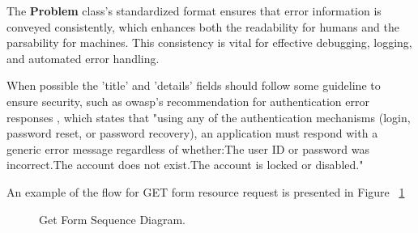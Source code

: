 The \textbf{Problem} class's standardized format ensures that error information is conveyed consistently, which enhances both the readability for humans and the parsability for machines. This consistency is vital for effective debugging, logging, and automated error handling.

When possible the 'title' and 'details' fields should follow some guideline to ensure security, such as owasp's recommendation for authentication error responses \cite{owasp_authentication}, which states that "using any of the authentication mechanisms (login, password reset, or password recovery), an application must respond with a generic error message regardless of whether:The user ID or password was incorrect.The account does not exist.The account is locked or disabled."

An example of the flow for GET form resource request is presented in Figure ~\ref{fig:getForm_Sequence_Diagram}

\begin{figure}[H]
	\begin{center}
	\end{center}
	\caption{Get Form Sequence Diagram.}\label{fig:getForm_Sequence_Diagram}
\end{figure}

